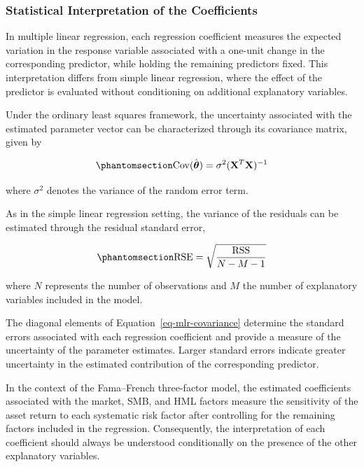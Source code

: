 \documentclass[
  12pt,
  letterpaper,
]{book}
\begin{document}
\subsubsection{Statistical Interpretation of the
Coefficients}\label{statistical-interpretation-of-the-coefficients}

In multiple linear regression, each regression coefficient measures the
expected variation in the response variable associated with a one-unit
change in the corresponding predictor, while holding the remaining
predictors fixed. This interpretation differs from simple linear
regression, where the effect of the predictor is evaluated without
conditioning on additional explanatory variables.

Under the ordinary least squares framework, the uncertainty associated
with the estimated parameter vector can be characterized through its
covariance matrix, given by

\begin{equation}\phantomsection\label{eq-mlr-covariance}{
\mathrm{Cov}(\hat{\boldsymbol{\theta}})
=
\sigma^2
(\mathbf{X}^T\mathbf{X})^{-1}
}\end{equation}

where \(\sigma^2\) denotes the variance of the random error term.

As in the simple linear regression setting, the variance of the
residuals can be estimated through the residual standard error,

\begin{equation}\phantomsection\label{eq-mlr-rse}{
\mathrm{RSE}
=
\sqrt{
\frac{
\mathrm{RSS}
}{
N - M - 1
}
}
}\end{equation}

where \(N\) represents the number of observations and \(M\) the number
of explanatory variables included in the model.

The diagonal elements of Equation~\ref{eq-mlr-covariance} determine the
standard errors associated with each regression coefficient and provide
a measure of the uncertainty of the parameter estimates. Larger standard
errors indicate greater uncertainty in the estimated contribution of the
corresponding predictor.

In the context of the Fama--French three-factor model, the estimated
coefficients associated with the market, SMB, and HML factors measure
the sensitivity of the asset return to each systematic risk factor after
controlling for the remaining factors included in the regression.
Consequently, the interpretation of each coefficient should always be
understood conditionally on the presence of the other explanatory
variables.
\end{document}
